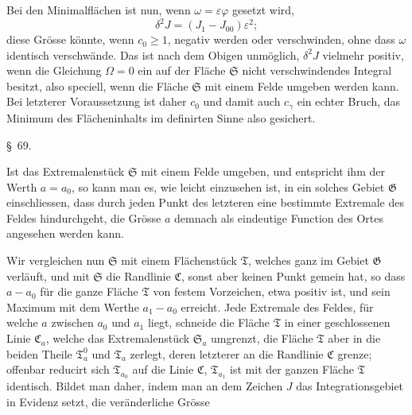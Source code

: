 \documentclass[11pt,a4paper,leqno]{article}
\begin{document}
Bei den Minimalflächen ist nun, wenn $\omega=\varepsilon\varphi$ gesetzt
wird,
\[
\delta^2J=(J_1-J_{00})\varepsilon^2;
\]
diese Grösse könnte, wenn $c_0\geq 1$, negativ werden oder verschwinden, ohne
dass $\omega$ identisch verschwände. Das ist nach dem Obigen unmöglich,
$\delta^2J$ vielmehr positiv, wenn die Gleichung $\Omega=0$ ein auf der Fläche
$\mathfrak{S}$ nicht verschwindendes Integral besitzt, also speciell, wenn
die Fläche $\mathfrak{S}$ mit einem Felde umgeben werden kann. Bei letzterer
Voraussetzung ist daher $c_0$ und damit auch $c_\gamma$ ein echter Bruch, das
Minimum des Flächeninhalts im definirten Sinne also gesichert.


\begin{center}
{\large \S~69.}
\end{center}

Ist das Extremalenstück $\mathfrak{S}$ mit einem Felde umgeben, und
entspricht ihm der Werth $a=a_0$, so kann man es, wie leicht einzusehen ist,
in ein solches Gebiet $\mathfrak{G}$ einschliessen, dass durch jeden Punkt des
letzteren eine bestimmte Extremale des Feldes hindurchgeht, die Grösse $a$
demnach als eindeutige Function des Ortes angesehen werden kann.

Wir vergleichen nun $\mathfrak{S}$ mit einem Flächenstück $\mathfrak{T}$,
welches ganz im Gebiet $\mathfrak{G}$ verläuft, und mit $\mathfrak{S}$ die
Randlinie $\mathfrak{C}$, sonst aber keinen Punkt gemein hat, so dass $a-a_0$
für die ganze Fläche $\mathfrak{T}$ von festem Vorzeichen, etwa positiv ist,
und sein Maximum mit dem Werthe $a_1-a_0$ erreicht. Jede Extremale des Feldes,
für welche $a$ zwischen $a_0$ und $a_1$ liegt, schneide die Fläche
$\mathfrak{T}$ in einer geschlossenen Linie $\mathfrak{C}_a$, welche das
Extremalenstück $\mathfrak{S}_a$ umgrenzt, die Fläche $\mathfrak{T}$ aber in
die beiden Theile $\mathfrak{T}_a^0$ und $\mathfrak{T}_a$ zerlegt, deren
letzterer an die Randlinie $\mathfrak{C}$ grenze; offenbar reducirt sich
$\mathfrak{T}_{a_0}$ auf die Linie $\mathfrak{C}$,
$\mathfrak{T}_{a_1}$ ist mit der ganzen Fläche $\mathfrak{T}$ identisch.
Bildet man daher, indem man an dem Zeichen $J$ das Integrationsgebiet in
Evidenz setzt, die veränderliche Grösse
\end{document}
